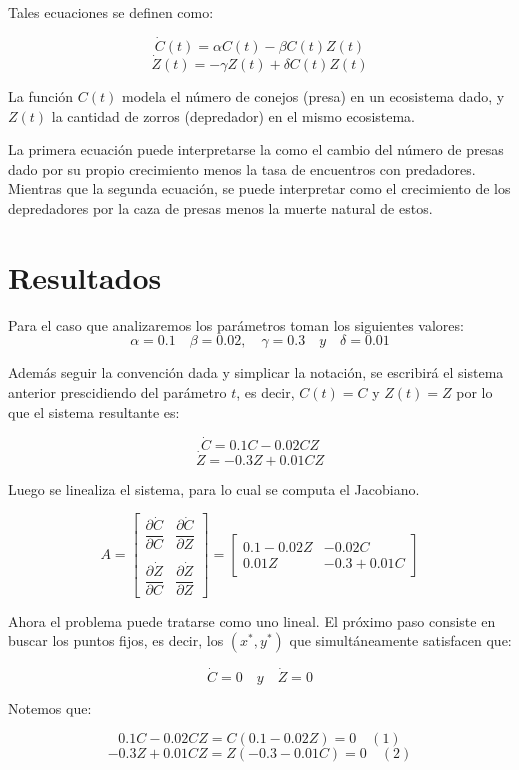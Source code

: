 \documentclass[12pt,letterpaper]{article}
\begin{document}
Tales ecuaciones se definen como:

$$\dot{C}(t) = \alpha C(t) - \beta C(t)Z(t)$$
$$\dot{Z}(t) = -\gamma Z(t) + \delta C(t)Z(t)$$

La función $C(t)$ modela el
número de conejos (presa) en un ecosistema dado, y $Z(t)$ la cantidad de zorros (depredador) en el mismo ecosistema. 

La primera ecuación puede interpretarse la como el cambio del número de presas dado por su propio crecimiento menos la tasa de encuentros con predadores. Mientras que la segunda ecuación, se puede interpretar como el crecimiento de los depredadores por la caza de presas menos la muerte natural de estos.


\section{Resultados}

Para el caso que analizaremos los parámetros toman los siguientes valores:
$$ \alpha= 0.1 \quad \beta = 0.02, \quad \gamma = 0.3 \quad y \quad  \delta = 0.01$$

Además seguir la convención dada y simplicar la notación, se escribirá el sistema anterior prescidiendo del parámetro $t$, es decir, $C(t) = C$ y $Z(t) = Z$ por lo que el sistema resultante es:

$$\dot{C} =  0.1 C - 0.02 CZ $$
$$\dot{Z} = -0.3 Z + 0.01 CZ $$


Luego se linealiza el sistema, para lo cual se computa el Jacobiano.

$$A = 
\begin{bmatrix}
\dfrac{\partial \dot{C}}{\partial C} & \dfrac{\partial \dot{C}}{\partial Z} \\
 & \\
\dfrac{\partial \dot{Z}}{\partial C} & \dfrac{\partial \dot{Z}}{\partial Z} 
\end{bmatrix} 
= 
\begin{bmatrix}
0.1 - 0.02 Z & -0.02 C \\
0.01 Z & -0.3 + 0.01 C  
\end{bmatrix}
$$

Ahora el problema puede tratarse como uno lineal. El próximo paso consiste en buscar los puntos fijos,  es decir, los $(x^*, y^*)$ que simultáneamente satisfacen que:

$$\dot{C} = 0 \quad y \quad \dot{Z} = 0 $$

Notemos que:

$$0.1 C - 0.02 CZ = C(0.1 - 0.02 Z) = 0 \quad (1)$$
$$−0.3 Z + 0.01 CZ = Z(-0.3 - 0.01 C) = 0 \quad (2)$$
\end{document}
